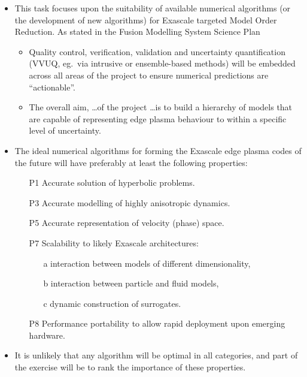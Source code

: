 \begin{itemize}
\item This task focuses upon the suitability of available numerical 
algorithms (or the development of new algorithms)
for Exascale targeted Model Order Reduction. As stated in the Fusion Modelling System
Science Plan
\begin{itemize}
\item Quality control, verification, validation and uncertainty quantification
(VVUQ, eg.\ via intrusive or ensemble-based methods) will be embedded across all
areas of the project to ensure numerical predictions are ``actionable''. 
\item The overall aim, 
\ldots of the project \ldots is to build a hierarchy of models that are capable of
representing edge plasma behaviour to within a specific level of uncertainty.
\end{itemize}

\item The ideal numerical algorithms for forming the Exascale edge plasma codes of 
the future will have preferably at least the following properties:
\begin{itemize}
\item[P1] Accurate solution of hyperbolic problems.
\item[P3] Accurate modelling of highly anisotropic dynamics. 
\item[P5] Accurate representation of velocity (phase) space.
\item[P7] Scalability to likely Exascale architectures:
\begin{itemize}
\item[a] interaction between models of different dimensionality,
\item[b] interaction between particle and fluid models,
\item[c] dynamic construction of surrogates.
\end{itemize}
\item[P8] Performance portability to allow rapid deployment upon emerging hardware.
\end{itemize}

\item It is unlikely that any algorithm will be optimal in all categories,
and part of the exercise
will be to rank the importance of these properties.
\end{itemize}

